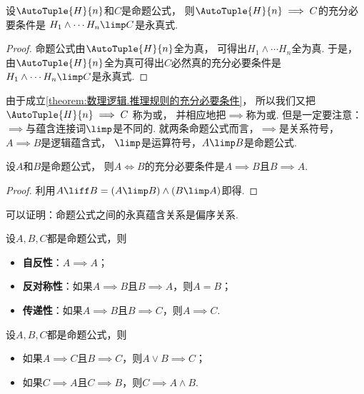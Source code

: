 \begin{theorem}\label{theorem:数理逻辑.推理规则的充分必要条件}
设\(\AutoTuple{H}{n}\)和\(C\)是命题公式，
则\(\AutoTuple{H}{n} \implies C\)的充分必要条件是
\(H_1 \land \dotsb H_n \limp C\)是永真式.
\begin{proof}
命题公式由\(\AutoTuple{H}{n}\)全为真，
可得出\(H_1 \land \dotsb H_n\)全为真.
于是，由\(\AutoTuple{H}{n}\)全为真可得出\(C\)必然真的充分必要条件是
\(H_1 \land \dotsb H_n \limp C\)是永真式.
\end{proof}
\end{theorem}
\begin{remark}
由于成立\cref{theorem:数理逻辑.推理规则的充分必要条件}，
所以我们又把\(\AutoTuple{H}{n} \implies C\)
称为或，
并相应地把\(\implies\)称为或.
但是一定要注意：\(\implies\)与蕴含连接词\(\limp\)是不同的.
就两条命题公式而言，\(\implies\)是关系符号，\(A \implies B\)是逻辑蕴含式，
\(\limp\)是运算符号，\(A \limp B\)是命题公式.
\end{remark}

\begin{theorem}
设\(A\)和\(B\)是命题公式，
则\(A \iff B\)的充分必要条件是\(A \implies B\)且\(B \implies A\).
\begin{proof}
利用\(A \liff B = (A \limp B) \land (B \limp A)\)即得.
\end{proof}
\end{theorem}

可以证明：命题公式之间的永真蕴含关系是偏序关系.
\begin{theorem}
设\(A,B,C\)都是命题公式，则\begin{itemize}
	\item {\rm\bf 自反性}：\(A \implies A\)；
	\item {\rm\bf 反对称性}：如果\(A \implies B\)且\(B \implies A\)，则\(A = B\)；
	\item {\rm\bf 传递性}：如果\(A \implies B\)且\(B \implies C\)，则\(A \implies C\).
\end{itemize}
\end{theorem}

\begin{theorem}
设\(A,B,C\)都是命题公式，则\begin{itemize}
	\item 如果\(A \implies C\)且\(B \implies C\)，则\(A \lor B \implies C\)；
	\item 如果\(C \implies A\)且\(C \implies B\)，则\(C \implies A \land B\).
\end{itemize}
\end{theorem}

